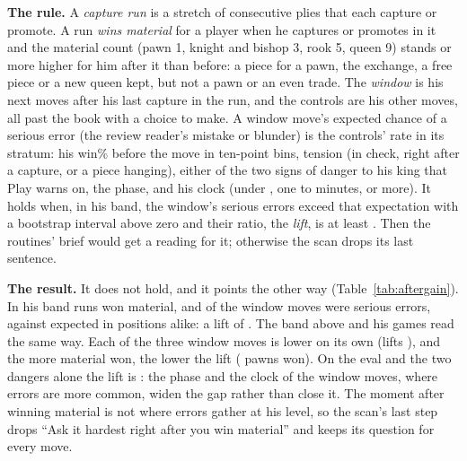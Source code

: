 \documentclass[11pt]{article}
\begin{document}
\textbf{The rule.} A \emph{capture run} is a stretch of consecutive plies that each capture or
promote. A run \emph{wins material} for a player when he captures or promotes in it and the material
count (pawn 1, knight and bishop 3, rook 5, queen 9) stands \AfterGainMin{} or more higher for him
after it than before: a piece for a pawn, the exchange, a free piece or a new queen kept, but not a
pawn or an even trade. The \emph{window} is his next \AfterGainWindow{} moves after his last
capture in the run, and the controls are his other moves, all past the book with a choice to make.
A window move's expected chance of a serious error (the review reader's mistake or blunder) is the
controls' rate in its stratum: his win\% before the move in ten-point bins, tension (in check, right
after a capture, or a piece hanging), either of the two signs of danger to his king that Play warns
on, the phase, and his clock (under \AfterGainClockLow, one to \AfterGainClockHigh{} minutes,
\AfterGainClockHigh{} or more). It holds when, in his band, the window's serious errors exceed that
expectation with a bootstrap interval above zero and their ratio, the \emph{lift}, is at least
\AfterGainLiftBar. Then the routines' brief would get a reading for it; otherwise the scan drops its
last sentence.

\textbf{The result.} It does not hold, and it points the other way (Table~\ref{tab:aftergain}). In
his band \AfterGainHisEvents{} runs won material, and \AfterGainHisRate{} of the
\AfterGainHisWindow{} window moves were serious errors, against \AfterGainHisExpected{} expected in
positions alike: a lift of \AfterGainHisLift. The band above and his games read the same way. Each
of the three window moves is lower on its own (lifts \AfterGainHisMoves), and the more material
won, the lower the lift (\AfterGainHisGains{} pawns won). On the eval and the two dangers alone the
lift is \AfterGainHisLooseLift: the phase and the clock of the window moves, where errors are more
common, widen the gap rather than close it. The moment after winning material is not where errors
gather at his level, so the scan's last step drops ``Ask it hardest right after you win material''
and keeps its question for every move.

\begin{table}[h]
\centering
\scriptsize\AfterGainTable
\caption{Serious errors in the three moves after a run that wins material, against their expected
number at the rate of other moves in positions alike. Lift and excess with bootstrap intervals over
the player-games.}
\label{tab:aftergain}
\end{table}
\end{document}
